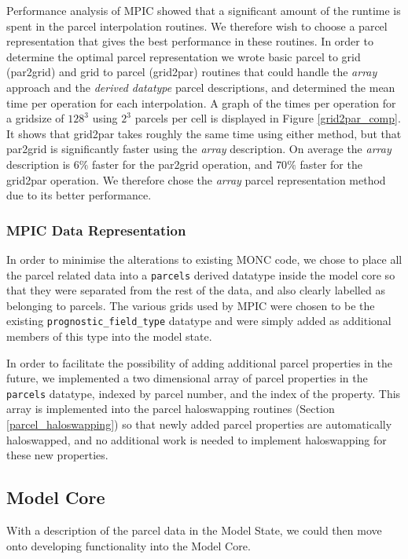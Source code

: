 \documentclass{article}
\begin{document}
Performance analysis of MPIC showed that a significant amount of the runtime is spent in the parcel interpolation routines. We therefore wish to choose a parcel representation that gives the best performance in these routines. In order to determine the optimal parcel representation we wrote basic parcel to grid (par2grid) and grid to parcel (grid2par) routines that could handle the \emph{array} approach and the \emph{derived datatype} parcel descriptions, and determined the mean time per operation for each interpolation. A graph of the times per operation for a gridsize of $128^3$ using $2^3$ parcels per cell is displayed in Figure \ref{grid2par_comp}. It shows that grid2par takes roughly the same time using either method, but that par2grid is significantly faster using the \emph{array} description. On average the \emph{array} description is $6\%$ faster for the par2grid operation, and $70\%$ faster for the grid2par operation. We therefore chose the \emph{array} parcel representation method due to its better performance.



\subsubsection{MPIC Data Representation}
In order to minimise the alterations to existing MONC code, we chose to place all the parcel related data into a \verb|parcels| derived datatype inside the model core so that they were separated from the rest of the data, and also clearly labelled as belonging to parcels. The various grids used by MPIC were chosen to be the existing \verb|prognostic_field_type| datatype and were simply added as additional members of this type into the model state.

In order to facilitate the possibility of adding additional parcel properties in the future, we implemented a two dimensional array of parcel properties in the \verb|parcels| datatype, indexed by parcel number, and the index of the property. This array is implemented into the parcel haloswapping routines (Section \ref{parcel_haloswapping}) so that newly added parcel properties are automatically haloswapped, and no additional work is needed to implement haloswapping for these new properties.

\subsection{Model Core}
With a description of the parcel data in the Model State, we could then move onto developing functionality into the Model Core.
\end{document}
